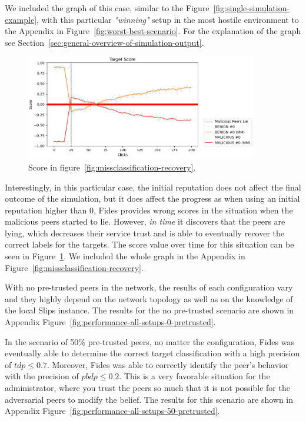 We included the graph of this case, similar to the Figure~\ref{fig:single-simulation-example}, with this particular \textit{"winning"} setup in the most hostile environment to the Appendix in Figure~\ref{fig:worst-best-scenario}. For the explanation of the graph see Section~\ref{sec:general-overview-of-simulation-output}.

\begin{figure}[h!]
    \centering
    \includegraphics[width=0.9\textwidth]{assets/misclassification_score.png}
    \caption{Score in figure~\ref{fig:missclassification-recovery}.}
    \label{fig:missclassification-score-only}
\end{figure}

Interestingly, in this particular case, the initial reputation does not affect the final outcome of the simulation, but it does affect the progress as when using an initial reputation higher than $0$, Fides provides wrong scores in the situation when the malicious peers started to lie.
However, \textit{in time} it discovers that the peers are lying, which decreases their service trust and is able to eventually recover the correct labels for the targets.
The score value over time for this situation can be seen in Figure~\ref{fig:missclassification-score-only}.
We included the whole graph in the Appendix in Figure~\ref{fig:missclassification-recovery}.

With no pre-trusted peers in the network, the results of each configuration vary and they highly depend on the network topology as well as on the knowledge of the local Slips instance. The results for the no pre-trusted scenario are shown in Appendix Figure~\ref{fig:performance-all-setups-0-pretrusted}.

In the scenario of 50\% pre-trusted peers, no matter the configuration, Fides was eventually able to determine the correct target classification with a high precision of $tdp \leq 0.7$. Moreover, Fides was able to correctly identify the peer's behavior with the precision of $pbdp \leq 0.2$. This is a very favorable situation for the administrator, where you trust the peers so much that it is not possible for the adversarial peers to modify the belief. The results for this scenario are shown in Appendix Figure~\ref{fig:performance-all-setups-50-pretrusted}.

